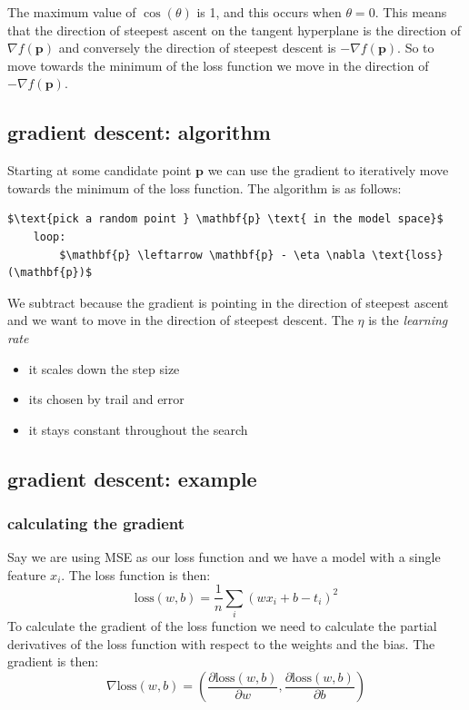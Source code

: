 \documentclass[12pt]{article}
\begin{document}
The maximum value of $\cos(\theta)$ is 1, and this occurs when $\theta = 0$. This means that the direction of steepest ascent on the tangent hyperplane is the direction of $\nabla f(\mathbf{p})$ and conversely the direction of steepest descent is $-\nabla f(\mathbf{p})$. So to move towards the minimum of the loss function we move in the direction of $-\nabla f(\mathbf{p})$.

\subsection{gradient descent: algorithm}

Starting at some candidate point $\mathbf{p}$ we can use the gradient to iteratively move towards the minimum of the loss function. The algorithm is as follows:

\begin{lstlisting}[caption=gradient descent algorithm]
    $\text{pick a random point } \mathbf{p} \text{ in the model space}$
    loop:
        $\mathbf{p} \leftarrow \mathbf{p} - \eta \nabla \text{loss}(\mathbf{p})$
\end{lstlisting}

We subtract because the gradient is pointing in the direction of steepest ascent and we want to move in the direction of steepest descent. The $\eta$ is the \textit{learning rate} 
\begin{itemize}[leftmargin=*, noitemsep]
    \item it scales down the step size
    \item its chosen by trail and error 
    \item it stays constant throughout the search 
\end{itemize}

\subsection{gradient descent: example}
\subsubsection*{calculating the gradient}
Say we are using MSE as our loss function and we have a model with a single feature $x_i$. The loss function is then:
\begin{equation}
    \text{loss}(w, b) = \frac{1}{n}\sum_{i}{(wx_i + b - t_i)}^2
\end{equation}
To calculate the gradient of the loss function we need to calculate the partial derivatives of the loss function with respect to the weights and the bias. The gradient is then:
\begin{equation}
    \nabla \text{loss}(w, b) = \left(\frac{\partial \text{loss}(w, b)}{\partial w}, \frac{\partial \text{loss}(w, b)}{\partial b}\right)
\end{equation}
\end{document}
